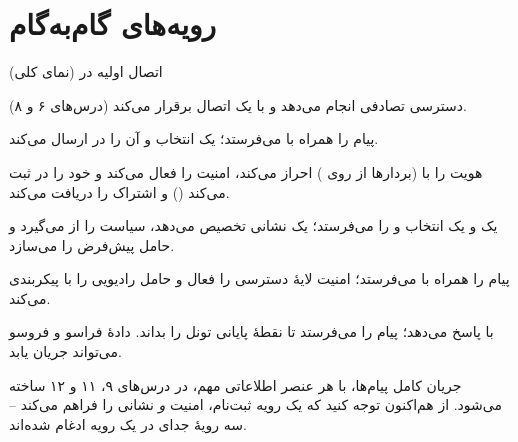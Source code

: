 \documentclass[11pt,a4paper]{article}
\begin{document}
\begin{acnfigure}
  \caption{جدایی صفحهٔ کنترل و کاربر در دروازه‌های  (نسخهٔ ۱۴).}
  \label{fig:cups}
\end{acnfigure}

\section{رویه‌های گام‌به‌گام}
\begin{procedurebox}{اتصال اولیه در  (نمای کلی)}\label{proc:attach}
\begin{steps}
  \item {} دسترسی تصادفی انجام می‌دهد و با  یک اتصال  برقرار می‌کند (درس‌های ۶ و ۸).
  \item پیام   را همراه با  می‌فرستد؛
         یک  انتخاب و آن را در   ارسال می‌کند.
  \item {} هویت  را با  (بردارها از  روی ) احراز می‌کند،
        امنیت  را فعال می‌کند و خود را در  ثبت می‌کند () و
        اشتراک را دریافت می‌کند.
  \item {} یک  و یک  انتخاب و   را
        می‌فرستد؛  یک نشانی  تخصیص می‌دهد، سیاست را از  می‌گیرد و حامل
        پیش‌فرض را می‌سازد.
  \item {} پیام   را همراه با 
        می‌فرستد؛  امنیت لایهٔ دسترسی را فعال و حامل رادیویی را با
         پیکربندی می‌کند.
  \item {} با  پاسخ می‌دهد؛  پیام  را
        می‌فرستد تا  نقطهٔ پایانی تونل  را بداند. دادهٔ فراسو و فروسو می‌تواند جریان یابد.
\end{steps}
\end{procedurebox}
جریان کامل پیام‌ها، با هر عنصر اطلاعاتی مهم، در درس‌های ۹، ۱۱ و ۱۲ ساخته می‌شود. از هم‌اکنون توجه
کنید که یک رویه ثبت‌نام، امنیت \emph{و} نشانی  را فراهم می‌کند -- سه رویهٔ جدای 
در یک رویه ادغام شده‌اند.

\end{document}
